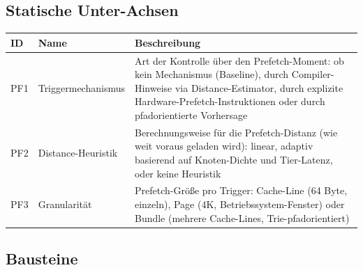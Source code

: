 \subsection*{Statische Unter-Achsen}

\begin{scriptsize}
\begin{longtable}{@{}>{\raggedright\arraybackslash}p{1.8cm} >{\raggedright\arraybackslash}p{3.2cm} >{\raggedright\arraybackslash}p{8.5cm}@{}}
\toprule
ID & Name & Beschreibung \\
\midrule
\endhead%
PF1 & Triggermechanismus & Art der Kontrolle über den Prefetch-Moment: ob kein Mechanismus (Baseline), durch Compiler-Hinweise via Distance-Estimator, durch explizite Hardware-Prefetch-Instruktionen oder durch pfadorientierte Vorhersage \\
PF2 & Distance-Heuristik & Berechnungsweise für die Prefetch-Distanz (wie weit voraus geladen wird): linear, adaptiv basierend auf Knoten-Dichte und Tier-Latenz, oder keine Heuristik \\
PF3 & Granularität & Prefetch-Größe pro Trigger: Cache-Line (64 Byte, einzeln), Page (4\allowbreak{}K, Betriebssystem-Fenster) oder Bundle (mehrere Cache-Lines, Trie-pfadorientiert) \\
\bottomrule
\end{longtable}
\end{scriptsize}

\subsection*{Bausteine}

